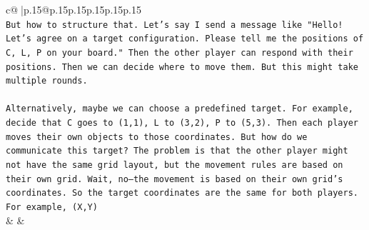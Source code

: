 \documentclass{article}
\begin{document}
{\begin{supertabular}{c@{$\;$}|p{.15\linewidth}@{}p{.15\linewidth}p{.15\linewidth}p{.15\linewidth}p{.15\linewidth}p{.15\linewidth}}
{{{\\ 
\texttt{But how to structure that. Let's say I send a message like "Hello! Let's agree on a target configuration. Please tell me the positions of C, L, P on your board." Then the other player can respond with their positions. Then we can decide where to move them. But this might take multiple rounds.} \\
\\ 
\texttt{Alternatively, maybe we can choose a predefined target. For example, decide that C goes to (1,1), L to (3,2), P to (5,3). Then each player moves their own objects to those coordinates. But how do we communicate this target? The problem is that the other player might not have the same grid layout, but the movement rules are based on their own grid. Wait, no—the movement is based on their own grid's coordinates. So the target coordinates are the same for both players. For example, (X,Y)} \\
            }
        }
    }
    & & \\ \\


\end{supertabular}}
\end{document}
